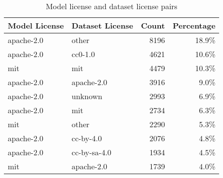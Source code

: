 \begin{table}[]
\caption{Model license and dataset license pairs}
\label{tab:dataset_model_licenses}
\begin{tabular}{llrr}
\hline
\textbf{Model License} & \textbf{Dataset License} & \textbf{Count} & \multicolumn{1}{l}{\textbf{Percentage}} \\ \hline
apache-2.0 & other & 8196 & 18.9\% \\
apache-2.0 & cc0-1.0 & 4621 & 10.6\% \\
mit & mit & 4479 & 10.3\% \\
apache-2.0 & apache-2.0 & 3916 & 9.0\% \\
apache-2.0 & unknown & 2993 & 6.9\% \\
apache-2.0 & mit & 2734 & 6.3\% \\
mit & other & 2290 & 5.3\% \\
apache-2.0 & cc-by-4.0 & 2076 & 4.8\% \\
apache-2.0 & cc-by-sa-4.0 & 1934 & 4.5\% \\
mit & apache-2.0 & 1739 & 4.0\% \\ \hline
\end{tabular}%
\end{table}
